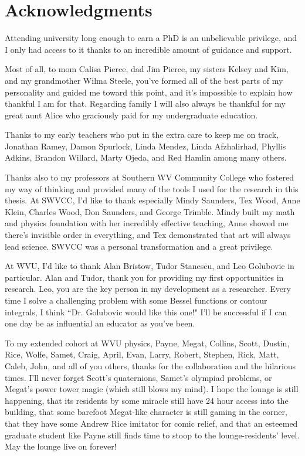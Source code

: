
\chapter{Acknowledgments}

Attending university long enough to earn a PhD is an unbelievable privilege, and I only had access to it thanks to an incredible amount of guidance and support.

Most of all, to mom Calisa Pierce, dad Jim Pierce, my sisters Kelsey and Kim, and my grandmother Wilma Steele, you've formed all of the best parts of my personality and guided me toward this point, and it's impossible to explain how thankful I am for that. Regarding family I will also always be thankful for my great aunt Alice who graciously paid for my undergraduate education.

Thanks to my early teachers who put in the extra care to keep me on track, Jonathan Ramey, Damon Spurlock, Linda Mendez, Linda Afzhalirhad, Phyllis Adkins, Brandon Willard, Marty Ojeda, and Red Hamlin among many others.
	
Thanks also to my professors at Southern WV Community College who fostered my way of thinking and provided many of the tools I used for the research in this thesis.
At SWVCC, I'd like to thank especially Mindy Saunders, Tex Wood, Anne Klein, Charles Wood, Don Saunders, and George Trimble. Mindy built my math and physics foundation with her incredibly effective teaching, Anne showed me there's invisible order in everything, and Tex demonstrated that art will always lead science. SWVCC was a personal transformation and a great privilege. 

At WVU, I'd like to thank Alan Bristow, Tudor Stanescu, and Leo Golubovic in particular. Alan and Tudor, thank you for providing my first opportunities in research. Leo, you are the key person in my development as a researcher. Every time I solve a challenging problem with some Bessel functions or contour integrals, I think ``Dr. Golubovic would like this one!" I'll be successful if I can one day be as influential an educator as you've been.

To my extended cohort at WVU physics, Payne, Megat, Collins, Scott, Dustin, Rice, Wolfe, Samet, Craig, April, Evan, Larry, Robert, Stephen, Rick, Matt, Caleb, John, and all of you others, thanks for the collaboration and the hilarious times. I'll never forget Scott's quaternions, Samet's olympiad problems, or Megat's power tower magic (which still blows my mind). I hope the lounge is still happening, that its residents by some miracle still have 24 hour access into the building, that some barefoot Megat-like character is still gaming in the corner, that they have some Andrew Rice imitator for comic relief, and that an esteemed graduate student like Payne still finds time to stoop to the lounge-residents' level. May the lounge live on forever!

